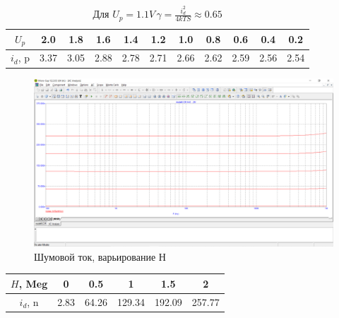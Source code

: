 \documentclass[a4paper, 12pt]{article}%
\begin{document}
\begin{table}[h!]
    \centering
    \begin{tabular}{|c|c|c|c|c|c|c|c|c|c|c|}
        $U_p$ & 2.0 & 1.8 & 1.6 & 1.4 & 1.2 & 1.0 & 0.8 & 0.6 & 0.4 & 0.2\\ \hline
        $i_d$, p & 3.37 & 3.05 & 2.88 & 2.78 & 2.71 & 2.66 & 2.62 & 2.59 & 2.56 & 2.54 \\ \hline
    \end{tabular}
    \caption{Для $U_p = 1.1 V\, \gamma = \frac{i_d^2}{4kTS} \approx 0.65$}
    \label{tab:mt612}
\end{table}

\begin{figure}[h!]
    \centering
    \includegraphics[scale = 0.4 \textwidth]{images/mod6_1_3.png}
    \caption{Шумовой ток, варьирование Н}
    \label{fig:m613}
\end{figure}

\begin{table}[h!]
    \centering
    \begin{tabular}{|c|c|c|c|c|c|}
        $H$, Meg & 0 & 0.5 & 1 & 1.5 & 2\\ \hline
        $i_d$, n & 2.83 & 64.26 & 129.34 & 192.09 & 257.77 \\ \hline
    \end{tabular}
    \label{tab:mt613}
\end{table}
\FloatBarrier
\end{document}
